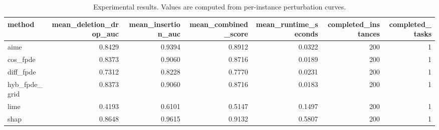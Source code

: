 \begin{table}[t]
\caption{Experimental results. Values are computed from per-instance perturbation curves.}
\label{tab:main_results_computed}
\centering
\begin{tabular}{lrrrrrr}
\toprule
method & mean\_deletion\_drop\_auc & mean\_insertion\_auc & mean\_combined\_score & mean\_runtime\_seconds & completed\_instances & completed\_tasks \\
\midrule
aime & 0.8429 & 0.9394 & 0.8912 & 0.0322 & 200 & 1 \\
cos\_fpde & 0.8373 & 0.9060 & 0.8716 & 0.0189 & 200 & 1 \\
diff\_fpde & 0.7312 & 0.8228 & 0.7770 & 0.0231 & 200 & 1 \\
hyb\_fpde\_grid & 0.8373 & 0.9060 & 0.8716 & 0.0183 & 200 & 1 \\
lime & 0.4193 & 0.6101 & 0.5147 & 0.1497 & 200 & 1 \\
shap & 0.8648 & 0.9615 & 0.9132 & 0.5807 & 200 & 1 \\
\bottomrule
\end{tabular}

\end{table}
